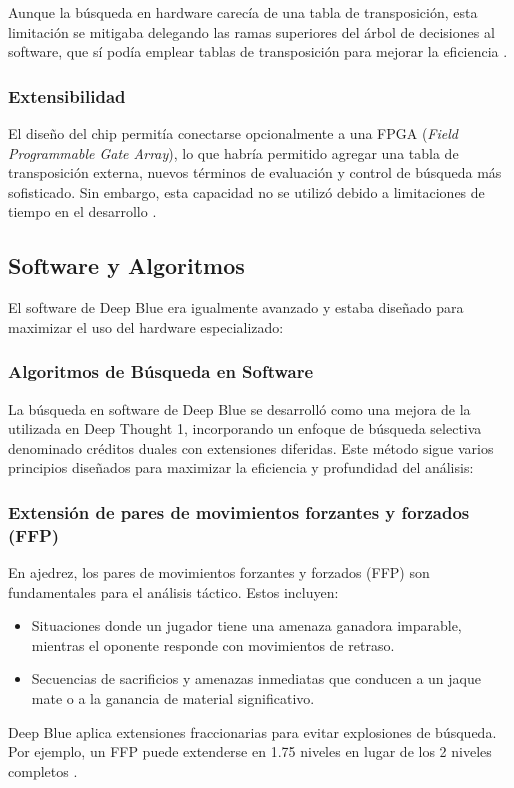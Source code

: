 \documentclass[12pt,a4paper]{article}
\begin{document}
Aunque la búsqueda en hardware carecía de una tabla de transposición, esta limitación se mitigaba delegando las ramas superiores del árbol de decisiones al software, que sí podía emplear tablas de transposición para mejorar la eficiencia \cite{campbell2002deepblue}.

\subsubsection*{Extensibilidad}
El diseño del chip permitía conectarse opcionalmente a una FPGA (\textit{Field Programmable Gate Array}), lo que habría permitido agregar una tabla de transposición externa, nuevos términos de evaluación y control de búsqueda más sofisticado. Sin embargo, esta capacidad no se utilizó debido a limitaciones de tiempo en el desarrollo \cite{campbell2002deepblue}.


\subsection{Software y Algoritmos}
El software de Deep Blue era igualmente avanzado y estaba diseñado para maximizar el uso del hardware especializado:

\subsubsection{Algoritmos de Búsqueda en Software}

La búsqueda en software de Deep Blue se desarrolló como una mejora de la utilizada en Deep Thought 1, incorporando un enfoque de búsqueda selectiva denominado créditos duales con extensiones diferidas. Este método sigue varios principios diseñados para maximizar la eficiencia y profundidad del análisis:

\subsubsection*{Extensión de pares de movimientos forzantes y forzados (FFP)}
En ajedrez, los pares de movimientos forzantes y forzados (FFP) son fundamentales para el análisis táctico. Estos incluyen:
\begin{itemize}
    \item Situaciones donde un jugador tiene una amenaza ganadora imparable, mientras el oponente responde con movimientos de retraso.
    \item Secuencias de sacrificios y amenazas inmediatas que conducen a un jaque mate o a la ganancia de material significativo.
\end{itemize}
Deep Blue aplica extensiones fraccionarias para evitar explosiones de búsqueda. Por ejemplo, un FFP puede extenderse en 1.75 niveles en lugar de los 2 niveles completos \cite{campbell2002deepblue}.
\end{document}
